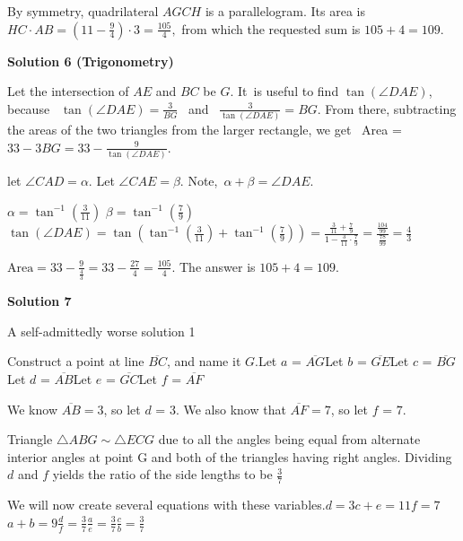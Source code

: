 \begin{enumerate}
 By symmetry, quadrilateral $AGCH$ is a parallelogram. Its area is $HC\cdot AB=\left(11-\frac94\right)\cdot3=\frac{105}{4},$ from which the requested sum is $105+4=\boxed{109}.$




\textbf{Solution 6 (Trigonometry)}

Let the intersection of $AE$ and $BC$ be $G$. It is useful to find $\tan(\angle DAE)$, because  $\tan(\angle DAE)=\frac{3}{BG}$  and  $\frac{3}{\tan(\angle DAE)}=BG$. From there, subtracting the areas of the two triangles from the larger rectangle, we get  Area = $33-3BG=33-\frac{9}{\tan(\angle DAE)}$.

 let $\angle CAD = \alpha$. Let $\angle CAE = \beta$. Note, $\alpha+\beta=\angle DAE$. 

 $\alpha=\tan^{-1}\left(\frac{3}{11}\right)$
$\beta=\tan^{-1}\left(\frac{7}{9}\right)$
$\tan(\angle DAE) = \tan\left(\tan^{-1}\left(\frac{3}{11}\right)+\tan^{-1}\left(\frac{7}{9}\right)\right) = \frac{\frac{3}{11}+\frac{7}{9}}{1-\frac{3}{11}\cdot\frac{7}{9}} = \frac{\frac{104}{99}}{\frac{78}{99}} = \frac{4}{3}$  

 $\mathrm{Area}=33-\frac{9}{\frac{4}{3}} = 33-\frac{27}{4 } = \frac{105}{4}$. The answer is $105+4=\boxed{109}$.

 



\textbf{Solution 7}

A self-admittedly worse solution 1

 Construct a point at line $\overline{BC}$, and name it $G$.Let $a$ = $\overline{AG}$Let $b$ = $\overline{GE}$Let $c$ = $\overline{BG}$Let $d$ = $\overline{AB}$Let $e$ = $\overline{GC}$Let $f$ = $\overline{AF}$

 We know $\overline{AB} = 3$, so let $d$ = $3$. We also know that $\overline{AF} = 7$, so let $f$ = $7$.

 Triangle $\triangle ABG \sim \triangle ECG$ due to all the angles being equal from alternate interior angles at point G and both of the triangles having right angles. Dividing $d$ and $f$ yields the ratio of the side lengths to be $\frac{3}{7}$

 We will now create several equations with these variables.$d = 3$$c + e = 11$$f =  7$$a + b = 9$$\frac{d}{f} = \frac{3}{7}$$\frac{a}{e} = \frac{3}{7}$$\frac{c}{b} = \frac{3}{7}$


\end{enumerate}
